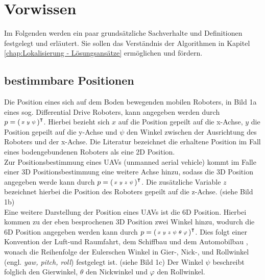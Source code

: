 \clearpage
\chapter{\textbf{Vorwissen}}\label{chap:Vorwissen}
Im Folgenden werden ein paar grundsätzliche Sachverhalte und Definitionen festgelegt und erläutert. Sie sollen das Verständnis der Algorithmen in Kapitel \ref{chap:Lokalisierung - Lösungsansätze} ermöglichen und fördern. 


\section{bestimmbare Positionen}\label{chap:bestimmbare Positionen}
Die Position eines sich auf dem Boden bewegenden mobilen Roboters, in Bild 1a  eines sog. Differential Drive Roboters, kann angegeben werden durch 
$p=\mathbf{\begin{psmallmatrix}
x & y & \psi
\end{psmallmatrix}}^\intercal$.
Hierbei bezieht sich $x$ auf die Position gepeilt auf die x-Achse, $y$ die Position gepeilt auf die y-Achse und $\psi$  den Winkel zwischen der Ausrichtung des Roboters und der x-Achse. Die Literatur bezeichnet die erhaltene Position im Fall eines bodengebundenen Roboters als eine 2D Position.\\
Zur Positionsbestimmung eines UAVs (unmanned aerial vehicle) kommt im Falle einer 3D Positionsbestimmung eine weitere Achse hinzu, sodass die 3D Position angegeben werde kann durch
$p=\mathbf{\begin{psmallmatrix}
x & y & z & \psi
\end{psmallmatrix}}^\intercal$.
Die zusätzliche Variable $z$ bezeichnet hierbei die Position des Roboters gepeilt auf die z-Achse. (siehe Bild 1b)\\
Eine weitere Darstellung der Position eines UAVs ist die 6D Position. Hierbei kommen zu der eben besprochenen 3D Position zwei Winkel hinzu, wodurch die 6D Position angegeben werden kann durch
$p=\mathbf{\begin{psmallmatrix}
x & y & z & \psi & \theta & \varphi
\end{psmallmatrix}}^\intercal$.
Dies folgt einer Konvention der Luft-und Raumfahrt, dem Schiffbau und dem Automobilbau \cite{website:cosmos-indirekt}, wonach die Reihenfolge der Eulerschen Winkel in Gier-, Nick-, und Rollwinkel (engl. \textit{yaw, pitch, roll}) festgelegt ist. (siehe Bild 1c) Der Winkel $\psi$ beschreibt folglich den Gierwinkel, $\theta$ den Nickwinkel und $\varphi$ den Rollwinkel.\\

